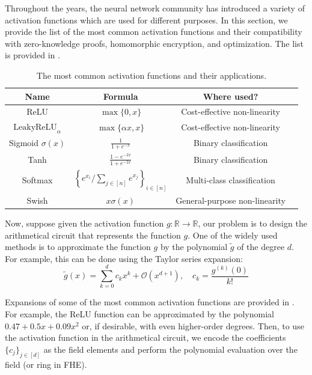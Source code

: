 \documentclass{iacrtrans}
\begin{document}
Throughout the years, the neural network community has introduced a variety of
activation functions which are used for different purposes. In this section, we
provide the list of the most common activation functions and their compatibility
with zero-knowledge proofs, homomorphic encryption, and optimization. The list
is provided in .

\begin{table}[H]
    \centering
    \begin{tabular}{cccc}
        \hline
        \textbf{Name} & \textbf{Formula} & \textbf{Where used?} \\
        \hline
        ReLU & $\max\{0,x\}$ & Cost-effective non-linearity \\
        $\text{LeakyReLU}_{\alpha}$ & $\max\{\alpha x,x\}$ & Cost-effective non-linearity \\
        Sigmoid $\sigma(x)$ & $\frac{1}{1+e^{-x}}$ & Binary classification \\
        Tanh & $\frac{1-e^{-2x}}{1+e^{-2x}}$ & Binary classification \\
        Softmax & $\left\{e^{x_i}/\sum_{j\in [n]}e^{x_j}\right\}_{i \in [n]}$ & Multi-class classification \\
        Swish & $x\sigma(x)$ & General-purpose non-linearity \\
        \hline
    \end{tabular}
    \caption{The most common activation functions and their applications.}
    \label{table:activations}
\end{table}

Now, suppose given the activation function $g: \mathbb{R} \to \mathbb{R}$, 
our problem is to design the arithmetical circuit that represents the function
$g$. One of the widely used methods is to approximate the function $g$ by the
polynomial $\widetilde{g}$ of the degree $d$. For example, this can be done using 
the Taylor series expansion:
\begin{equation*}
    \widetilde{g}(x) = \sum_{k=0}^d c_k x^k + \mathcal{O}(x^{d+1}), \quad c_k = \frac{g^{(k)}(0)}{k!}
\end{equation*}

Expansions of some of the most common activation functions are provided in
. For example, the ReLU function can be approximated by
the polynomial $0.47 + 0.5x + 0.09x^2$ or, if desirable, with even higher-order 
degrees. Then, to use the activation function in the arithmetical circuit, we
encode the coefficients $\{c_j\}_{j \in [d]}$ as the field elements and 
perform the polynomial evaluation over the field (or ring in FHE). 
\end{document}
